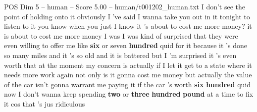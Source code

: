 \begin{textsample}{POS Dim 5 – human – Score 5.00 – human/t001202\_human.txt}  \label{ex:f5_pos_008}
I don't see the point of holding onto it obviously I 've said I wanna take you out in it tonight to listen to it you know when you just I know it 's about to cost me more money? it is about to cost me more money I was I was kind of surprised that they were even willing to offer me like \textbf{six} or seven \textbf{hundred} quid for it because it 's done so many miles and it 's so old and it is battered but I 'm surprised it 's even worth that at the moment my concern is actually if I let it get to a state where it needs more work again not only is it gonna cost me money but actually the value of the car isn't gonna warrant me paying it if the car 's worth \textbf{six} \textbf{hundred} quid now I don't wanna keep spending \textbf{two} or \textbf{three} \textbf{hundred} \textbf{pound} at a time to fix it cos that 's jus ridiculous

\end{textsample}
